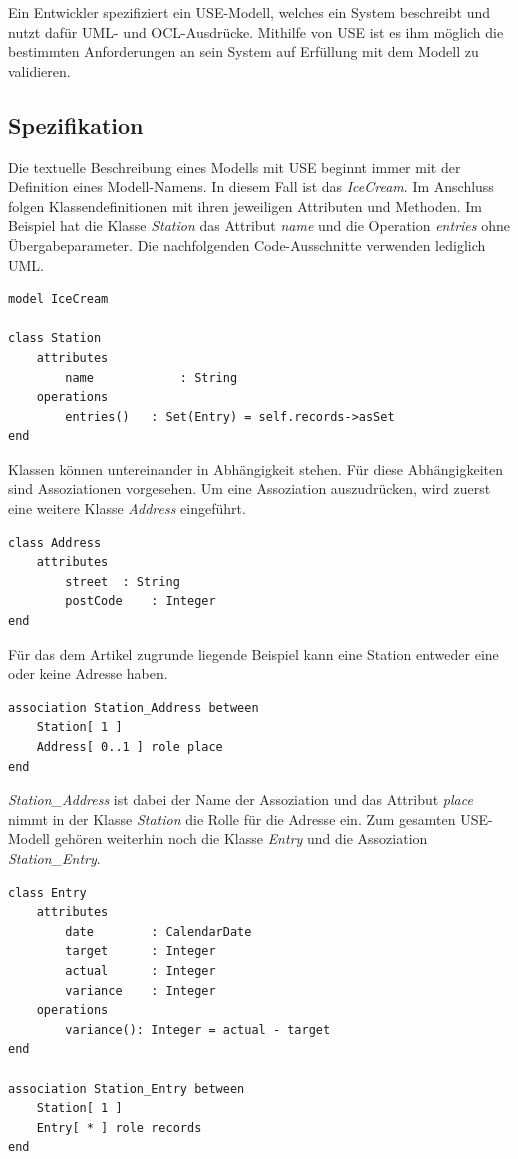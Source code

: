 \documentclass[a4paper,twoside]{article}
\begin{document}
Ein Entwickler spezifiziert ein USE-Modell, welches ein System beschreibt und nutzt dafür UML- und OCL-Ausdrücke. Mithilfe von USE ist es ihm möglich die bestimmten Anforderungen an sein System auf Erfüllung mit dem Modell zu validieren.

\subsection{Spezifikation}

Die textuelle Beschreibung eines Modells mit USE beginnt immer mit der Definition eines Modell-Namens. In diesem Fall ist das \textit{IceCream}. Im Anschluss folgen Klassendefinitionen mit ihren jeweiligen Attributen und Methoden. Im Beispiel hat die Klasse \textit{Station} das Attribut \textit{name} und die Operation \textit{entries} ohne Übergabeparameter. Die nachfolgenden Code-Ausschnitte verwenden lediglich UML.

\lstset{basicstyle=\tiny,style=myCustomUseStyle}
\begin{lstlisting}
model IceCream

class Station
	attributes
		name			: String
	operations
		entries()	: Set(Entry) = self.records->asSet
end
\end{lstlisting}

Klassen können untereinander in Abhängigkeit stehen. Für diese Abhängigkeiten sind Assoziationen vorgesehen. Um eine Assoziation auszudrücken, wird zuerst eine weitere Klasse \textit{Address} eingeführt.

\begin{lstlisting}
class Address
	attributes
		street	: String
		postCode	: Integer
end
\end{lstlisting}

Für das dem Artikel zugrunde liegende Beispiel kann eine Station entweder eine oder keine Adresse haben.

\begin{lstlisting}
association Station_Address between
	Station[ 1 ] 
	Address[ 0..1 ] role place
end
\end{lstlisting}

\textit{Station\_Address} ist dabei der Name der Assoziation und das Attribut \textit{place} nimmt in der Klasse \textit{Station} die Rolle für die Adresse ein. Zum gesamten USE-Modell gehören weiterhin noch die Klasse \textit{Entry} und die Assoziation \textit{Station\_Entry}.

\begin{lstlisting}
class Entry
	attributes
		date		: CalendarDate
		target		: Integer
		actual		: Integer
		variance	: Integer
	operations
		variance(): Integer = actual - target	
end

association Station_Entry between
	Station[ 1 ] 
	Entry[ * ] role records
end
\end{lstlisting}
\end{document}
